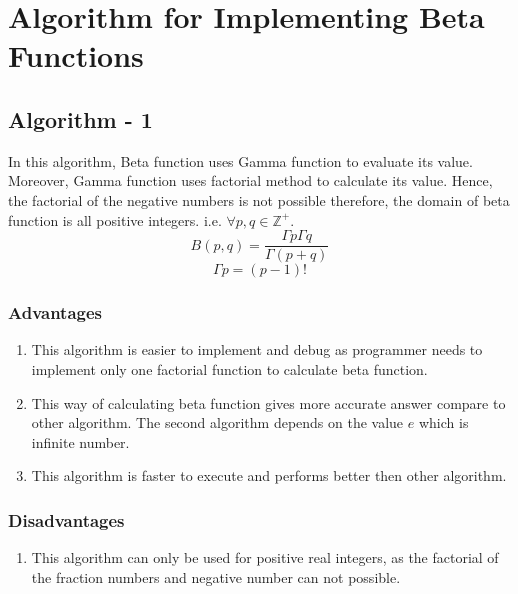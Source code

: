 \documentclass[12pt,report]{article}
\begin{document}
\section {Algorithm for Implementing Beta Functions}
\subsection{Algorithm - 1}
In this algorithm, Beta function uses Gamma function to evaluate its value. Moreover, Gamma function uses factorial method to calculate its value. Hence, the factorial of the negative numbers is not possible therefore, the domain of beta function is all positive integers. i.e. $\forall p,q \in \mathbb Z^+$.
\[B(p,q) = \frac{\Gamma p \Gamma q}{\Gamma (p+q)}\]
\[\Gamma p = (p-1)!\]
\subsubsection{Advantages}
\begin{enumerate}
    \item This algorithm is easier to implement and debug as programmer needs to implement only one factorial function to calculate beta function.
    \item This way of calculating beta function gives more accurate answer compare to other algorithm. The second algorithm depends on the value $e$ which is infinite number.
    \item This algorithm is faster to execute and performs better then other algorithm.
\end{enumerate}

\subsubsection{Disadvantages}
\begin{enumerate}
    \item This algorithm can only be used for positive real integers, as the factorial of the fraction numbers and negative number can not possible.
\end{enumerate}
\end{document}
